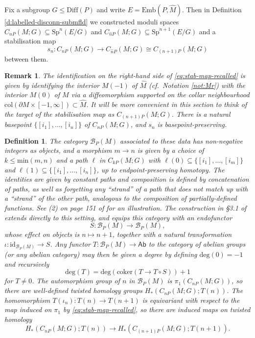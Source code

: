 \documentclass[reqno,a4paper]{article}
\numberwithin{equation}{section}
\theoremstyle{italicised}
\theoremstyle{upright}
\newtheorem{defn}[thm]{Definition}
\newtheorem{rmk}[thm]{Remark}
\theoremstyle{italicised-restate}
\newcommand{\cf}{\textit{cf}.\ }
\newcommand{\cB}{\mathcal{B}}
\renewcommand{\leq}{\leqslant}
\begin{document}
Fix a subgroup $G \leq \mathrm{Diff}(P)$ and write $E = \mathrm{Emb}(P,\hat{M})$. Then in Definition \ref{d:labelled-disconn-submfld} we constructed moduli spaces $C_{nP}(M;G) \subseteq \mathrm{Sp}^n(E/G)$ and $C_{\hat{n}P}(M;G) \subseteq \mathrm{Sp}^{n+1}(E/G)$ and a stabilisation map
\begin{equation}\label{eq:stab-map-recalled}
s_n \colon C_{nP}(M;G) \longrightarrow C_{\hat{n}P}(M;G) \cong C_{(n+1)P}(M;G)
\end{equation}
between them.

\begin{rmk}\label{r:nhat-nplusone}
The identification on the right-hand side of \eqref{eq:stab-map-recalled} is given by identifying the interior $M(-1)$ of $\hat{M}$ (\cf Notation \ref{not:Mr}) with the interior $M(0)$ of $M$ via a diffeomorphism supported on the collar neighbourhood $\mathrm{col}(\partial M \times [-1,\infty]) \subset \hat{M}$. It will be more convenient in this section to think of the target of the stabilisation map as $C_{(n+1)P}(M;G)$. There is a natural basepoint $\{[i_1],\ldots,[i_n]\}$ of $C_{nP}(M;G)$, and $s_n$ is basepoint-preserving.
\end{rmk}

\begin{defn}\label{d:bpm}
The category $\cB_P(M)$ associated to these data has non-negative integers as objects, and a morphism $m \to n$ is given by a choice of $k \leq \mathrm{min}(m,n)$ and a path $\ell$ in $C_{kP}(M;G)$ with $\ell(0) \subseteq \{ [i_1],\ldots,[i_m] \}$ and $\ell(1) \subseteq \{ [i_1],\ldots,[i_n] \}$, up to endpoint-preserving homotopy. The identities are given by constant paths and composition is defined by concatenation of paths, as well as forgetting any ``strand'' of a path that does not match up with a ``strand'' of the other path, analogous to the composition of partially-defined functions. See (2) on page 151 of \cite{Palmer2018Twistedhomologicalstability} for an illustration. The construction in \S 3.1 of \cite{Palmer2018Twistedhomologicalstability} extends directly to this setting, and equips this category with an endofunctor
\[
S \colon \cB_P(M) \longrightarrow \cB_P(M),
\]
whose effect on objects is $n \mapsto n+1$, together with a natural transformation $\iota \colon \mathrm{id}_{\cB_P(M)} \to S$. Any functor $T \colon \cB_P(M) \to \mathsf{Ab}$ to the category of abelian groups (or any abelian category) may then be given a \emph{degree} by defining $\mathrm{deg}(0) = -1$ and recursively
\[
\mathrm{deg}(T) = \mathrm{deg}(\mathrm{coker}(T \to T \circ S)) + 1
\]
for $T \neq 0$. The automorphism group of $n$ in $\cB_P(M)$ is $\pi_1(C_{nP}(M;G))$, so there are well-defined twisted homology groups $H_*(C_{nP}(M;G);T(n))$. The homomorphism $T(\iota_n) \colon T(n) \to T(n+1)$ is equivariant with respect to the map induced on $\pi_1$ by \eqref{eq:stab-map-recalled}, so there are induced maps on twisted homology
\begin{equation}\label{eq:map-on-twisted-homology}
H_*(C_{nP}(M;G);T(n)) \longrightarrow H_*(C_{(n+1)P}(M;G);T(n+1)).
\end{equation}
\end{defn}
\end{document}
